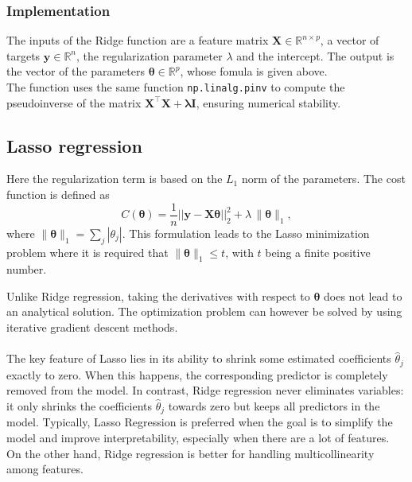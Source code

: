 \documentclass[
 reprint,            %
 amsmath,amssymb,
 aps,
]{revtex4-2}
\begin{document}
\subsubsection{Implementation}
The inputs of the Ridge function are a feature matrix $\mathbf{X} \in \mathbb{R}^{n \times p}$, a vector of targets $\mathbf{y} \in \mathbb{R}^n$, the regularization parameter $\lambda$ and the intercept.
The output is the vector of the parameters $\boldsymbol{\theta} \in \mathbb{R}^{p}$, whose fomula is given above.\\
The function uses the same function \texttt{np.linalg.pinv} to compute the pseudoinverse of the matrix $\mathbf{X}^\top \mathbf{X} + \boldsymbol{\lambda}\mathbf{I}$, ensuring numerical stability.

\subsection{Lasso regression}
Here the regularization term is based on the $L_1$ norm of the parameters\cite{hjorthjensen_week35}.
The cost function is defined as
$$
C(\boldsymbol{\theta}) 
= \frac{1}{n}\vert\vert \boldsymbol{y}-\boldsymbol{X}\boldsymbol{\theta}\vert\vert_2^2
+ \lambda \, \|\boldsymbol{\theta}\|_1,
$$
where $\|\boldsymbol{\theta}\|_1 = \sum_{j}|\theta_j|$.  
This formulation leads to the Lasso minimization problem where it is required that $\|\boldsymbol{\theta}\|_1 \leq t$, with $t$ being a finite positive number. 

Unlike Ridge regression, taking the derivatives with respect to $\boldsymbol{\theta}$ does not lead to an analytical solution. 
The optimization problem can however be solved by using iterative gradient descent methods.\\ \\
The key feature of Lasso lies in its ability to shrink some estimated coefficients $\hat{\theta}_j$ exactly to zero. 
When this happens, the corresponding predictor is completely removed from the model.  
In contrast, Ridge regression never eliminates variables: it only shrinks the coefficients $\hat{\theta}_j$ towards zero but keeps all predictors in the model.
Typically, Lasso Regression is preferred when the goal is to simplify the model and improve interpretability, especially when there are a lot of features.
On the other hand, Ridge regression is better for handling multicollinearity among features. 
\end{document}
